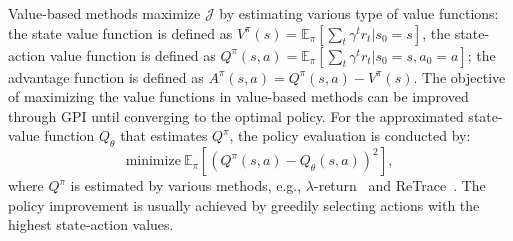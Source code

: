 Value-based methods maximize $\mathcal{J}$ by estimating various type of value functions: the state value function is defined as { $V^{\pi}(s) = \mathbb{E}_{\pi}\left[ \sum_t \gamma^t r_{t} | s_0=s \right]$}, the state-action value function is defined as { $Q^{\pi}(s, a) = \mathbb{E}_{\pi} \left[ \sum_t \gamma^t r_{t} | s_0=s, a_0=a \right]$}; the advantage function is defined as $A^{\pi}(s, a) = Q^{\pi}(s, a) - V^{\pi}(s)$.
The objective of maximizing the value functions in value-based methods 
can be improved through GPI until converging to the optimal policy.
For the approximated state-value function $Q_\theta$ that estimates $Q^\pi$, the policy evaluation is conducted by:{ 
\begin{equation}
\mbox{minimize}\ \mathbb{E}_{\pi}
 [(Q^\pi(s, a) - Q_\theta (s, a))^2],
 \end{equation}}
where $Q^\pi$ is estimated by various methods, e.g., $\lambda$-return~\citep{Sutton88lambda} and ReTrace~\citep{retrace}.
The policy improvement is usually achieved by greedily selecting actions with the highest state-action values.

